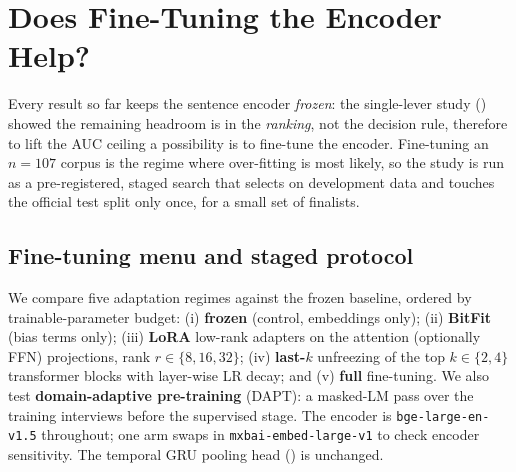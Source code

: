%   
\section{Does Fine-Tuning the Encoder Help?}
\label{sec:finetune}

Every result so far keeps the sentence encoder \emph{frozen}: the
single-lever study () showed the remaining headroom is in the
\emph{ranking}, not the decision rule, therefore to lift the AUC ceiling a possibility is
to fine-tune the encoder.
Fine-tuning an $n\!=\!107$ corpus is the regime where over-fitting is most
likely, so the study is run as a pre-registered, staged search that selects on
development data and touches the official test split only once, for a small set
of finalists.

\subsection{Fine-tuning menu and staged protocol}
\label{sec:finetune-protocol}
We compare five adaptation regimes against the frozen baseline, ordered by
trainable-parameter budget: (i) \textbf{frozen} (control, embeddings only);
(ii) \textbf{BitFit} (bias terms only); (iii) \textbf{LoRA} low-rank adapters on
the attention (optionally FFN) projections, rank $r\!\in\!\{8,16,32\}$;
(iv) \textbf{last-$k$} unfreezing of the top $k\!\in\!\{2,4\}$ transformer
blocks with layer-wise LR decay; and (v) \textbf{full} fine-tuning. We also test
\textbf{domain-adaptive pre-training} (DAPT): a masked-LM pass over the training
interviews before the supervised stage. The encoder is \texttt{bge-large-en-v1.5}
throughout; one arm swaps in \texttt{mxbai-embed-large-v1} to check
encoder sensitivity. The temporal GRU pooling head
() is unchanged.

